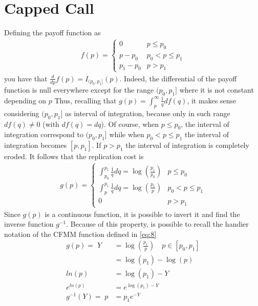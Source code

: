 \documentclass[12pt]{article}
\begin{document}
\section{Capped Call}
Defining the payoff function as
\begin{align*}
    f(p) = \begin{cases}
               0       & p\leq p_0     \\
               p-p_0   & p_0<p\leq p_1 \\
               p_1-p_0 & p>p_1
           \end{cases}
\end{align*}
you have that $\frac{d}{dp}f(p)=I_{(p_0,p_1]}(p)$. Indeed, the differential of the payoff function is null everywhere except for the range $(p_0,p_1]$ where it is not constant depending on $p$
Thus, recalling that $g(p)=\int_p^\infty \frac{1}{q}df(q)$, it makes sense considering $(p_0,p_1]$ as interval of integration, because only in such range $df(q)\neq 0$ (with $df(q)=dq$).
Of course, when $p\leq p_0$, the interval of integration correspond to $(p_0,p_1]$ while when $p_0<p\leq p_1$ the interval of integration becomes $[p,p_1]$. If $p>p_1$ the interval of integration is completely eroded.
It follows that the replication cost is
\begin{align*}
    g(p)=\begin{cases}
             \int_{p_0}^{p_1} \frac{1}{q}dq = \log(\frac{p_1}{p_0}) & p\leq p_0     \\
             \int_{p}^{p_1} \frac{1}{q}dq = \log(\frac{p_1}{p})     & p_0<p\leq p_1 \\
             0                                                      & p>p_1
         \end{cases}
\end{align*}
Since $g(p)$ is a continuous function, it is possible to invert it and find the inverse function $g^{-1}$. Because of this property, is possible to recall the handier notation of the CFMM function defined in \eqref{eq:8}
\begin{align*}
    g(p) =\;  Y   & = \log\left(\frac{p_1}{p}\right)\quad p\in[p_0,p_1] \\
                  & = \log(p_1)-\log(p)                                 \\
    ln(p)         & = \log(p_1)-Y                                       \\
    e^{ln(p)}     & = e^{\log(p_1)-Y}                                   \\
    g^{-1}(Y)=\;p & = p_1e^{-Y}                                         \\
\end{align*}
\end{document}
